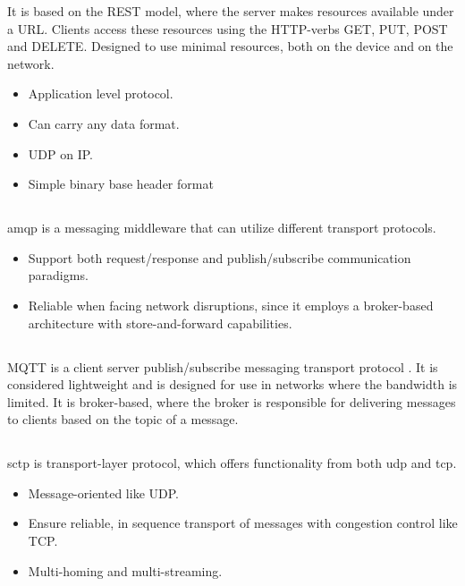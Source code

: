 It is based on the REST model, where the server makes resources available  under
a URL. Clients access these resources using the HTTP-verbs GET, PUT, POST and
DELETE. Designed to use minimal resources, both on the device and on the
network.

\begin{itemize}
    \item Application level protocol.
    \item Can carry any data format.
    \item UDP on IP.
    \item Simple binary base header format
\end{itemize}


\subsection{}

\gls{amqp} is a messaging middleware that can utilize different transport
protocols.

\begin{itemize}
    \item Support both request/response and publish/subscribe communication
    paradigms.
    \item Reliable when facing network disruptions, since it employs a
    broker-based architecture with store-and-forward capabilities.
\end{itemize}

\subsection{}

MQTT is a client server publish/subscribe messaging transport protocol
\cite{oasis-mqtt}. It is considered lightweight and is designed for use in networks
where the bandwidth is limited. It is broker-based, where the broker is
responsible for delivering messages to clients based on the topic of a
message.

\subsection{}

\gls{sctp} is transport-layer protocol, which offers functionality from both \gls{udp} and \gls{tcp}.
\begin{itemize}
    \item Message-oriented like UDP.
    \item Ensure reliable, in sequence transport of messages with congestion control like TCP.
    \item Multi-homing and multi-streaming.
\end{itemize}



